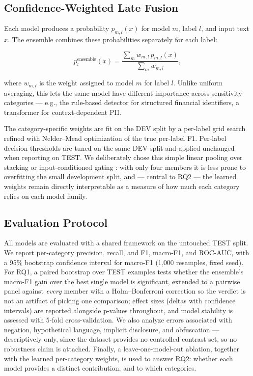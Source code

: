 \documentclass{article}
\begin{document}
\subsection{Confidence-Weighted Late Fusion}
\label{subsec:fusion}

Each model produces a probability $p_{m,l}(x)$ for model $m$, label
$l$, and input text $x$. The ensemble combines these probabilities
separately for each label:

\begin{equation}
    p_{l}^{\text{ensemble}}(x)
    =
    \frac{
        \sum_{m} w_{m,l} \, p_{m,l}(x)
    }{
        \sum_{m} w_{m,l}
    },
    \label{eq:weighted-fusion}
\end{equation}

where $w_{m,l}$ is the weight assigned to model $m$ for label $l$.
Unlike uniform averaging, this lets the same model have different
importance across sensitivity categories --- e.g., the rule-based
detector for structured financial identifiers, a transformer for
context-dependent PII.

The category-specific weights are fit on the DEV split by a per-label
grid search refined with Nelder--Mead optimization of the true
per-label F1. Per-label decision thresholds are tuned on the same DEV
split and applied unchanged when reporting on TEST. We deliberately
chose this simple linear pooling over stacking \citep{wolpert1992stacked}
or input-conditioned gating \citep{jacobs1991adaptive}: with only four
members it is less prone to overfitting the small development split,
and --- central to RQ2 --- the learned weights remain directly
interpretable as a measure of how much each category relies on each
model family.

\subsection{Evaluation Protocol}
\label{subsec:evaluation}

All models are evaluated with a shared framework on the untouched TEST
split. We report per-category precision, recall, and F1, macro-F1, and
ROC-AUC, with a 95\% bootstrap confidence interval for macro-F1
(1{,}000 resamples, fixed seed). For RQ1, a paired bootstrap over TEST
examples tests whether the ensemble's macro-F1 gain over the best
single model is significant, extended to a pairwise panel against
\emph{every} member with a Holm--Bonferroni correction so the verdict
is not an artifact of picking one comparison; effect sizes (deltas with
confidence intervals) are reported alongside p-values throughout, and
model stability is assessed with 5-fold cross-validation. We also
analyze errors associated with negation, hypothetical language,
implicit disclosure, and obfuscation --- descriptively only, since the
dataset provides no controlled contrast set, so no robustness claim is
attached. Finally, a leave-one-model-out ablation, together with the
learned per-category weights, is used to answer RQ2: whether each model
provides a distinct contribution, and to which categories.
\end{document}
